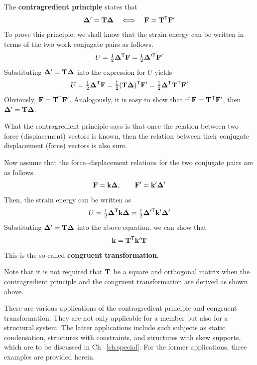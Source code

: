 The \textbf{contragredient principle} states that
\begin{equation}
  \bm{\Delta}' = \mathbf{T}\bm{\Delta} \quad\Longleftrightarrow\quad \mathbf{F} = \mathbf{T}^{\mathsf{T}}\mathbf{F}'
\end{equation}
To prove this principle, we shall know that the strain energy can be written in terms of the two work conjugate pairs as follows.
\begin{equation}
  U = \tfrac12\bm{\Delta}^{\mathsf{T}}\mathbf{F} = \tfrac12\bm{\Delta}'^{\mathsf{T}}\mathbf{F}'
\end{equation}
Substituting $\bm{\Delta}' = \mathbf{T}\bm{\Delta}$ into the expression for $U$ yields
\begin{equation}
  U = \tfrac12\bm{\Delta}^{\mathsf{T}}\mathbf{F} = \tfrac12(\mathbf{T}\bm{\Delta})^{\mathsf{T}}\mathbf{F}' = \tfrac12\bm{\Delta}^{\mathsf{T}}\mathbf{T}^{\mathsf{T}}\mathbf{F}'
\end{equation}
Obviously, $\mathbf{F} = \mathbf{T}^{\mathsf{T}}\mathbf{F}'$. Analogously, it is easy to show that if $\mathbf{F} = \mathbf{T}^{\mathsf{T}}\mathbf{F}'$, then $\bm{\Delta}' = \mathbf{T}\bm{\Delta}$.

What the contragredient principle says is that once the relation between two force (displacement) vectors is known, then the relation between their conjugate displacement (force) vectors is also sure.

Now assume that the force--displacement relations for the two conjugate pairs are as follows.
\begin{equation}
  \mathbf{F} = \mathbf{k}\bm{\Delta},\qquad \mathbf{F}' = \mathbf{k}'\bm{\Delta}'
\end{equation}
Then, the strain energy can be written as
\begin{equation}
  U = \tfrac12\bm{\Delta}^{\mathsf{T}}\mathbf{k}\bm{\Delta} = \tfrac12\bm{\Delta}'^{\mathsf{T}}\mathbf{k}'\bm{\Delta}'
\end{equation}
Substituting $\bm{\Delta}' = \mathbf{T}\bm{\Delta}$ into the above equation, we can show that
\begin{equation}
  \mathbf{k} = \mathbf{T}^{\mathsf{T}}\mathbf{k}'\mathbf{T}
\end{equation}
This is the so-called \textbf{congruent transformation}.

Note that it is not required that $\mathbf{T}$ be a square and orthogonal matrix when the contragredient principle and the congruent transformation are derived as shown above.

There are various applications of the contragredient principle and congruent transformation. They are not only applicable for a member but also for a structural system. The latter applications include such subjects as static condensation, structures with constraints, and structures with skew supports, which are to be discussed in Ch.~\ref{ch:special}. For the former applications, three examples are provided herein.


